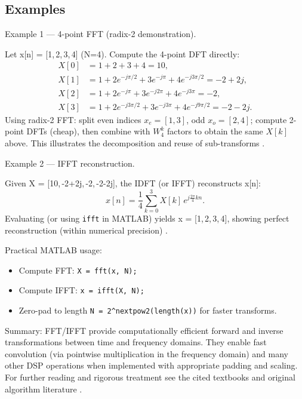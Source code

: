 \documentclass[11pt]{article}
\begin{document}
\subsection*{Examples}

Example 1 — 4-point FFT (radix-2 demonstration).

Let x[n] = [1,\,2,\,3,\,4] (N=4). Compute the 4-point DFT directly:
\begin{align*}
    X[0] & = 1+2+3+4 = 10,                                              \\
    X[1] & = 1 + 2e^{-j\pi/2} + 3e^{-j\pi} + 4e^{-j3\pi/2} = -2 + 2j,   \\
    X[2] & = 1 + 2e^{-j\pi} + 3e^{-j2\pi} + 4e^{-j3\pi} = -2,           \\
    X[3] & = 1 + 2e^{-j3\pi/2} + 3e^{-j3\pi} + 4e^{-j9\pi/2} = -2 - 2j.
\end{align*}
Using radix-2 FFT: split even indices $x_e=[1,3]$, odd $x_o=[2,4]$; compute 2-point DFTs (cheap), then combine with $W_4^k$ factors to obtain the same $X[k]$ above. This illustrates the decomposition and reuse of sub-transforms \cite{oppenheim2010discrete,lyons2011understanding}.

Example 2 — IFFT reconstruction.

Given X = [10,\,-2+2j,\,-2,\,-2-2j], the IDFT (or IFFT) reconstructs x[n]:
\begin{equation*}
    x[n] = \frac{1}{4}\sum_{k=0}^{3} X[k]\,e^{j\frac{2\pi}{4}kn}.
\end{equation*}
Evaluating (or using \texttt{ifft} in MATLAB) yields x = [1,\,2,\,3,\,4], showing perfect reconstruction (within numerical precision) \cite{proakis2007digital}.

Practical MATLAB usage:
\begin{itemize}
    \item Compute FFT: \texttt{X = fft(x, N);} \\
    \item Compute IFFT: \texttt{x = ifft(X, N);} \\
    \item Zero-pad to length \verb|N = 2^nextpow2(length(x))| for faster transforms.
\end{itemize}

Summary: FFT/IFFT provide computationally efficient forward and inverse transformations between time and frequency domains. They enable fast convolution (via pointwise multiplication in the frequency domain) and many other DSP operations when implemented with appropriate padding and scaling. For further reading and rigorous treatment see the cited textbooks and original algorithm literature \cite{oppenheim2010discrete,proakis2007digital,lyons2011understanding,cooley1965algorithm}.
\end{document}

